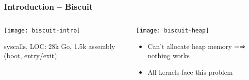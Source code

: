 \begin{frame}[plain]
	\frametitle{Introduction -- Biscuit}
	
	\begin{columns}
		
		\begin{column}{.4\textwidth}
			
			\texttt{[image: biscuit-intro]}
			
			 syscalls, LOC: 28k Go,
			1.5k assembly (boot, entry/exit)
			
		\end{column}
		
		\begin{column}{.6\textwidth}
			\texttt{[image: biscuit-heap]}
			\begin{itemize}
				\item Can’t allocate heap memory =⇒ nothing works
				\item All kernels face this problem

			\end{itemize}
		\end{column}
	\end{columns}	
\end{frame}

